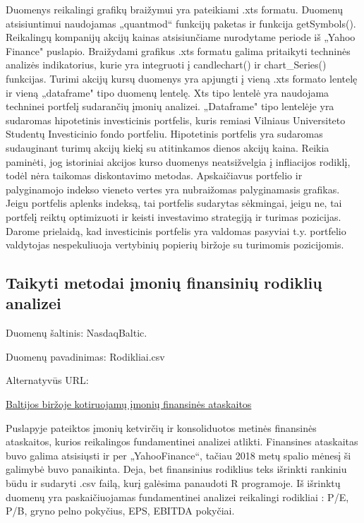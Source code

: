\documentclass[titlepage, 11pt]{article}
\begin{document}
Duomenys reikalingi grafikų braižymui yra pateikiami .xts formatu. Duomenų atsisiuntimui naudojamas „quantmod“ funkcijų paketas ir funkcija getSymbols(). Reikalingų kompanijų akcijų kainas atsisiunčiame nurodytame periode iš „Yahoo Finance" puslapio. Braižydami grafikus .xts formatu galima pritaikyti techninės analizės indikatorius, kurie yra integruoti į candlechart() ir chart\_Series() funkcijas. Turimi akcijų kursų duomenys yra apjungti į vieną .xts formato lentelę ir vieną „dataframe" tipo duomenų lentelę. Xts tipo lentelė yra naudojama techninei portfelį sudarančių įmonių analizei. „Dataframe" tipo lentelėje yra sudaromas hipotetinis investicinis portfelis, kuris remiasi Vilniaus Universiteto Studentų Investicinio fondo portfeliu. Hipotetinis portfelis yra sudaromas sudauginant turimų akcijų kiekį su atitinkamos dienos akcijų kaina. Reikia paminėti, jog istoriniai akcijos kurso duomenys neatsižvelgia į infliacijos rodiklį, todėl nėra taikomas diskontavimo metodas. Apskaičiavus portfelio ir palyginamojo indekso vieneto vertes yra nubraižomas palyginamasis grafikas. Jeigu portfelis aplenks indeksą, tai portfelis sudarytas sėkmingai, jeigu ne, tai portfelį reiktų optimizuoti ir keisti investavimo strategiją ir turimas pozicijas. Darome prielaidą, kad investicinis portfelis yra valdomas pasyviai t.y. portfelio valdytojas nespekuliuoja vertybinių popierių biržoje su turimomis pozicijomis.


\subsection{Taikyti metodai įmonių finansinių rodiklių analizei}

Duomenų šaltinis: NasdaqBaltic.

Duomenų pavadinimas: Rodikliai.csv

Alternatyvūs URL:

\href{https://www.nasdaqbaltic.com/market/?pg=reports&lang=lt}{Baltijos biržoje kotiruojamų įmonių finansinės ataskaitos}

Puslapyje pateiktos įmonių ketvirčių ir konsoliduotos metinės finansinės ataskaitos, kurios reikalingos fundamentinei analizei atlikti. Finansines ataskaitas buvo galima atsisiųsti ir per „YahooFinance“, tačiau 2018 metų spalio mėnesį ši galimybė buvo panaikinta. Deja, bet finansinius rodiklius teks išrinkti rankiniu būdu ir sudaryti .csv failą, kurį galėsima panaudoti R programoje. Iš išrinktų duomenų yra paskaičiuojamas fundamentinei analizei reikalingi rodikliai : P/E, P/B, gryno pelno pokyčius, EPS, EBITDA pokyčiai.
\end{document}
